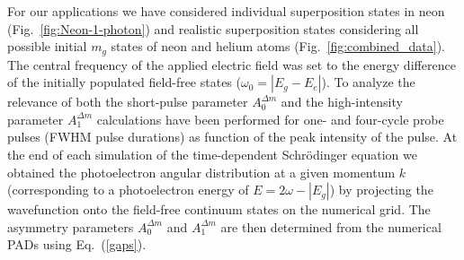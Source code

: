 For our applications we have considered individual superposition states in neon (Fig.~\ref{fig:Neon-1-photon}) and realistic superposition states considering all possible initial $m_g$ states of neon and helium atoms (Fig.~\ref{fig:combined_data}). The central frequency of the applied electric field was set to the energy difference of the initially populated field-free states ($\omega_0=|E_g-E_e|$). To analyze the relevance of both the short-pulse parameter $A_0^{\Delta m}$ and the high-intensity parameter $A_1^{\Delta m}$ calculations have been performed for one- and four-cycle probe pulses (FWHM pulse durations) as function of the peak intensity of the pulse. At the end of each simulation of the time-dependent Schr\"odinger equation we obtained the photoelectron angular distribution at a given momentum $k$ (corresponding to a photoelectron energy of $E=2\omega-|E_g|$) by projecting the wavefunction onto the field-free continuum states on the numerical grid. The asymmetry parameters $A_0^{\Delta m}$ and $A_1^{\Delta m}$ are then determined from the numerical PADs using Eq.~(\ref{gaps}).

